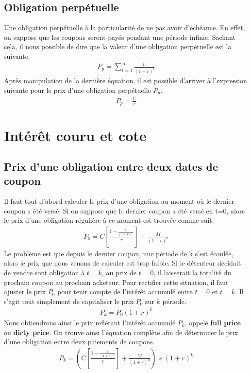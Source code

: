 \documentclass[letterpaper, 12pt]{article}
\newcommand{\1}{\mathds{1}}	%
\theoremstyle{definition}
\begin{document}
\subsection{Obligation perpétuelle}
Une obligation perpétuelle à la particularité de ne pas avoir d'échéance. En effet, on suppose que les coupons seront payés pendant une période infinie. Sachant cela, il nous possible de dire que la valeur d'une obligation perpétuelle est la suivante.
\begin{align*}
P_{p}=\sum_{t=1}^{\infty} \frac{C}{(1+r)^t}
\end{align*} 
Après manipulation de la dernière équation, il est possible d'arriver à l'expression suivante  pour le prix d'une obligation perpétuelle $P_p$.
\begin{align*}
P_p=\frac{C}{r}
\end{align*}

\section{Intérêt couru et cote}

\subsection{Prix d'une obligation entre deux dates de coupon}
Il faut tout d'abord calculer le prix d'une obligation au moment où le dernier coupon a été versé. Si on suppose que le dernier coupon a été versé en t=0, alors le prix d'une obligation régulière à ce moment est trouvée comme suit:
\begin{align*}
P_0=C \left[ \frac{1-\frac{1}{(1+r)^n}}{r} \right]+\frac{M}{(1+r)^n}
\end{align*}
Le problème est que depuis le dernier coupon, une période de k s'est écoulée, alors le prix que nous venons de calculer est trop faible. Si le détenteur décidait de vendre sont obligation à $t= k$, au prix de $t=0$, il laisserait la totalité du prochain coupon au prochain acheteur. Pour rectifier cette situation, il faut ajuster le prix $P_0$ pour tenir compte de l'intérêt accumulé entre $t=0$ et $t=k$. Il s'agit tout simplement de capitaliser le prix $P_0$ sur $k$ période. 
\begin{align*}
P_k=P_0 (1+r)^k
\end{align*}
Nous obtiendrons ainsi le prix reflétant l'intérêt accumulé $P_k$, appelé \textbf{full price} ou \textbf{dirty price}. On trouve ainsi l'équation complète afin de déterminer le prix d'une obligation entre deux paiements de coupons.
\begin{align*}
P_k= \left( C \left[ \frac{1-\frac{1}{(1+r)^n}}{r} \right]+\frac{M}{(1+r)^n} \right) \times (1+r)^k
\end{align*}
\newpage
\end{document}
